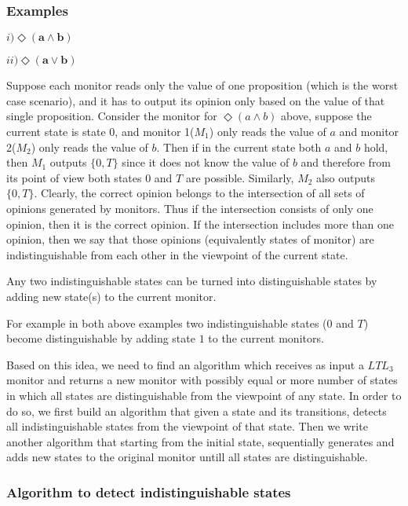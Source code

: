 \subsubsection*{Examples}

\textbf{ $i)\mathbf{\Diamond (a \wedge b)}$}

\textbf{ $ii)\mathbf{\Diamond (a \vee b)}$}


Suppose each monitor reads only the value of one proposition (which is the worst case scenario), and it has to output its opinion only based on the value of that single proposition. Consider the monitor for $\Diamond (a \wedge b)$ above, suppose the current state is state $0$, and monitor 1($M_1$) only reads the value of $a$ and monitor 2($M_2$) only reads the value of $b$. Then if in the current state both $a$ and $b$ hold, then $M_1$ outputs $\{0,T\}$ since it does not know the value of $b$ and therefore from its point of view both states $0$ and $T$ are possible. Similarly, $M_2$ also outputs  $\{0,T\}$. Clearly, the correct opinion belongs to the intersection of all sets of opinions generated by monitors. Thus if the intersection consists of only one opinion, then it is the correct opinion. If the intersection includes more than one opinion, then we say that those opinions (equivalently states of monitor) are indistinguishable from each other in the viewpoint of the current state. 

\begin{claim}

Any two indistinguishable states can be turned into distinguishable states by adding new state(s) to the current monitor. 

\end{claim}

 For example in both above examples two indistinguishable states ($0$ and $T$) become distinguishable by adding state $1$ to the current monitors. 
 
 
 Based on this idea, we need to find an algorithm which receives as input a $LTL_3$ monitor and returns a new monitor with possibly equal or more number of states in which all states are distinguishable from the viewpoint of any state. In order to do so, we first build an algorithm that given a state and its transitions, detects all indistinguishable states from the viewpoint of that state. Then we write another algorithm  that starting from the initial state, sequentially generates and adds new states to the original monitor untill all states are distinguishable. 
 
 \subsubsection*{Algorithm to detect indistinguishable states}
 
